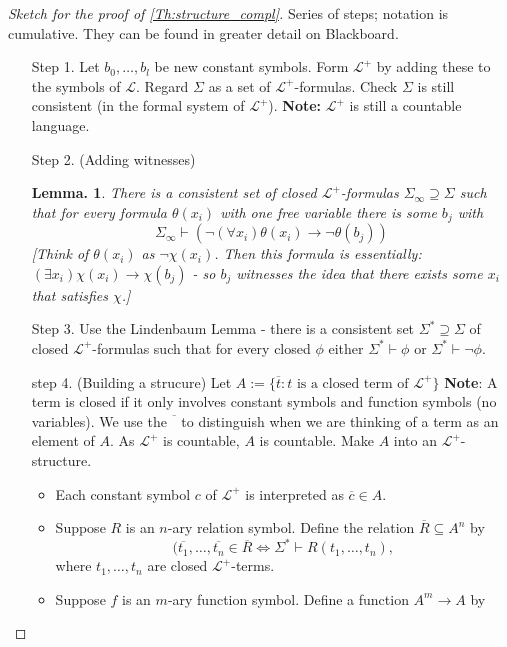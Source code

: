 \documentclass[a4paper,oneside,11pt,DIV=12,parskip=half]{scrartcl}
\newcommand{\LL}{\mathcal L}
\theoremstyle{plain}
\newtheorem{lemma}[theorem]{Lemma.}
\theoremstyle{definition}
\newtheorem{remark, definition}[theorem]{Remark and Definition.}
\newtheorem{lemma, definition}[theorem]{Lemma and Definition.}
\newtheorem{theorem, definition}[theorem]{Theorem and Definition.}
\theoremstyle{remark}
\newtheorem*{remark, example}{\textbf{Remark and Exercise}}
\begin{document}
\begin{proof}[Sketch for the proof of \ref{Th:structure_compl}]
Series of steps; notation is cumulative. They can be found in greater detail on Blackboard.

\begin{enumerate}
    \item[Step 1.] Let $b_0,\dots,b_l$ be new constant symbols. Form $\LL^+$ by adding these to the symbols of $\LL$. Regard $\Sigma$ as a set of $\LL^+$-formulas. Check $\Sigma$ is still consistent (in the formal system of $\LL^+$).
    \textbf{Note:} $\LL^+$ is still a countable language.
    \item[Step 2.] (Adding witnesses)
    \begin{lemma}
    There is a consistent set of closed $\LL^+$-formulas $\Sigma_\infty \supseteq \Sigma$ such that for every formula $\theta(x_i)$ with one free variable there is some $b_j$ with 
        \[ \Sigma_\infty \vdash (\lnot(\forall x_i) \theta(x_i) \rightarrow \lnot \theta(b_j)) \]
    [Think of $\theta(x_i)$ as $\lnot \chi(x_i)$. Then this formula is essentially: $(\exists x_i) \chi(x_i) \rightarrow \chi(b_j)$ - so $b_j$ witnesses the idea that there exists some $x_i$ that satisfies $\chi$.]
    \end{lemma}
    \item[Step 3.] Use the Lindenbaum Lemma - there is a consistent set $\Sigma^* \supseteq \Sigma$ of closed $\LL^+$-formulas such that for every closed $\phi$ either $\Sigma^* \vdash \phi$ or $\Sigma^* \vdash \lnot \phi$.
    \item[step 4.] (Building a strucure)
    Let $A:= \{ \overline{t} : t \text{ is a closed term of } \LL^+ \}$
    \textbf{Note}: A term is closed if it only involves constant symbols and function symbols (no variables). We use the $\overline{\phantom{t}}$ to distinguish when we are thinking of a term as an element of $A$. 
    As $\LL^+$ is countable, $A$ is countable. Make $A$ into an $\LL^+$-structure.
    \begin{itemize}
        \item Each constant symbol $c$ of $\LL^+$ is interpreted as $\overline{c} \in A$.
        \item Suppose $R$ is an $n$-ary relation symbol. Define the relation $\overline{R} \subseteq A^n $ by
            \[ (\overline{t_1},\dots,\overline{t_n} \in \overline{R} \Leftrightarrow \Sigma^* \vdash R(t_1,\dots,t_n), \]
        where $t_1,\dots,t_n$ are closed $\LL^+$-terms.
        \item Suppose $f$ is an $m$-ary function symbol. Define a function $A^m \rightarrow A$ by 

\end{itemize}
\end{enumerate}
\end{proof}
\end{document}
